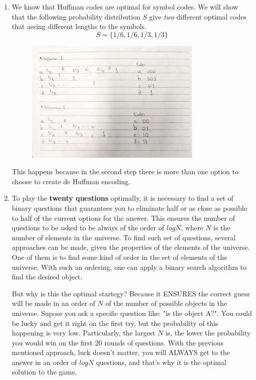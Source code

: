 \documentclass{article}
\begin{document}
\begin{enumerate}
\begin{enumerate}
\begin{figure}[H]
		            \end{figure}
	      \end{enumerate}
	\item We know that Huffman codes are optimal for symbol codes. We will show that the following probability distribution \(S\) give \textit{two} different optimal codes that assing different lengths to the symbols.
	      \[S = \{1/6,1/6,1/3,1/3\}\]
	      \begin{figure}[H]
		      \centering
		      \includegraphics[width=0.8\textwidth]{images/it3-1.png}
	      \end{figure}

	      This happens because in the second step there is more than one option to choose to create de Huffman encoding.

	\item To play the \textbf{twenty questions} optimally, it is necessary to find a set of binary questions that guarantees you to eliminate half or as close as possible to half of the current options for the answer. This ensures the number of questions to be asked to be always of the order of \(log N\), where \(N\) is the number of elements in the universe. To find such set of questions, several approaches can be made, given the properties of the elements of the universe. One of them is to find some kind of order in the set of elements of the universe. With such an ordering, one can apply a binary search algorithm to find the desired object.

	      But why is this the optimal startegy? Because it ENSURES the correct guess will be made in an order of \(N\) of the number of possible objects in the universe. Supose you ask a specific question like: "is the object A?". You could be lucky and get it right on the first try, but the probability of this happening is very low. Particularly, the largest \(N\) is, the lower the probability you would win on the first 20 rounds of questions. With the previous mentioned approach, luck doesn't matter, you will ALWAYS get to the answer in an order of \(log N\) questions, and that's why it is the optimal solution to the game.

\end{enumerate}


\end{document}
